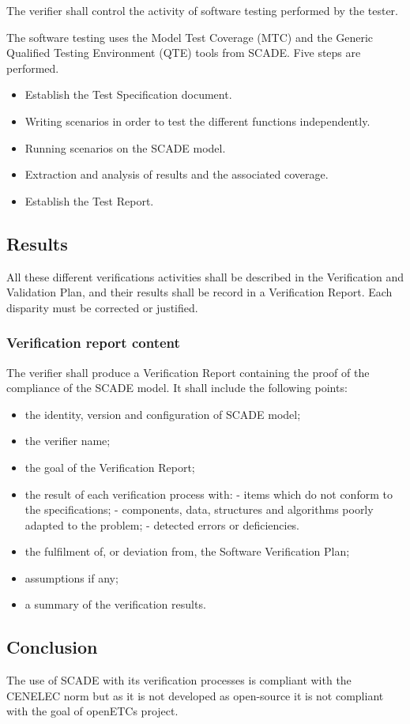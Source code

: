 The verifier shall control the activity of software testing performed by the tester.

The software testing uses the Model Test Coverage (MTC) and the Generic Qualified Testing Environment (QTE) tools from SCADE. Five steps are performed.
\begin{itemize}
\item Establish the Test Specification document.
\item Writing scenarios in order to test the different functions independently.
\item Running scenarios on the SCADE model.
\item Extraction and analysis of results and the associated coverage.
\item Establish the Test Report.
\end{itemize}

\subsection{Results}

All these different verifications activities shall be described in the Verification and Validation Plan, and their results shall be record in a Verification Report. Each disparity must be corrected or justified.

\subsubsection{Verification report content}

The verifier shall produce a Verification Report containing the proof of the compliance of the SCADE model. It shall include the following points:
\begin{itemize}
\item the identity, version and configuration of SCADE model;
\item the verifier name;
\item the goal of the Verification Report;
\item the result of each verification process with:
\subitem - items which do not conform to the specifications;
\subitem - components, data, structures and algorithms poorly adapted to the problem;
\subitem - detected errors or deficiencies.
\item the fulfilment of, or deviation from, the Software Verification Plan;
\item assumptions if any;
\item a summary of the verification results.
\end{itemize}

\subsection{Conclusion}

The use of SCADE with its verification processes is compliant with the CENELEC norm but as it is not developed as open-source it is not compliant with the goal of openETCs project. 
